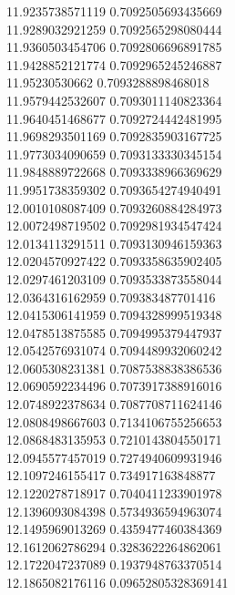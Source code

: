 {11.9235738571119 0.7092505693435669 \\
11.9289032921259 0.7092565298080444 \\
11.9360503454706 0.7092806696891785 \\
11.9428852121774 0.7092965245246887 \\
11.95230530662 0.7093288898468018 \\
11.9579442532607 0.7093011140823364 \\
11.9640451468677 0.7092724442481995 \\
11.9698293501169 0.7092835903167725 \\
11.9773034090659 0.7093133330345154 \\
11.9848889722668 0.7093338966369629 \\
11.9951738359302 0.7093654274940491 \\
12.0010108087409 0.7093260884284973 \\
12.0072498719502 0.7092981934547424 \\
12.0134113291511 0.7093130946159363 \\
12.0204570927422 0.7093358635902405 \\
12.0297461203109 0.7093533873558044 \\
12.0364316162959 0.709383487701416 \\
12.0415306141959 0.7094328999519348 \\
12.0478513875585 0.7094995379447937 \\
12.0542576931074 0.7094489932060242 \\
12.0605308231381 0.7087538838386536 \\
12.0690592234496 0.7073917388916016 \\
12.0748922378634 0.7087708711624146 \\
12.0808498667603 0.7134106755256653 \\
12.0868483135953 0.7210143804550171 \\
12.0945577457019 0.7274940609931946 \\
12.1097246155417 0.734917163848877 \\
12.1220278718917 0.7040411233901978 \\
12.1396093084398 0.5734936594963074 \\
12.1495969013269 0.4359477460384369 \\
12.1612062786294 0.3283622264862061 \\
12.1722047237089 0.1937948763370514 \\
12.1865082176116 0.09652805328369141 \\
}
